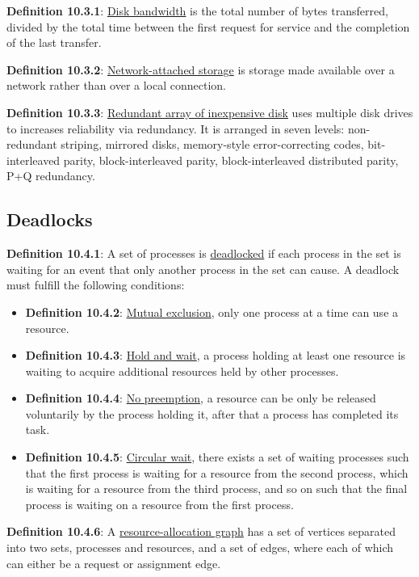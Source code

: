 \documentclass{article}
\newcommand{\separate}[1] {\vspace{#1 pt}\noindent}
\newcommand{\definition}[2]{\textbf{Definition #1}: #2\label{def:#1}}
\begin{document}
\separate{7}\definition{10.3.1}{\underline{Disk bandwidth} is the total number of bytes transferred, divided by the total time between the first request for service and the completion of the last transfer.}

\separate{7}\definition{10.3.2}{\underline{Network-attached storage} is storage made available over a network rather than over a local connection.}

\separate{7}\definition{10.3.3}{\underline{Redundant array of inexpensive disk} uses multiple disk drives to increases reliability via redundancy. It is arranged in seven levels: non-redundant striping, mirrored disks, memory-style error-correcting codes, bit-interleaved parity, block-interleaved parity, block-interleaved distributed parity, P+Q redundancy.}

\subsection{Deadlocks}

\definition{10.4.1}{A set of processes is \underline{deadlocked} if each process in the set is waiting for an event that only another process in the set can cause. A deadlock must fulfill the following conditions:}
\begin{itemize}
    \item \definition{10.4.2}{\underline{Mutual exclusion}, only one process at a time can use a resource.}
    \item \definition{10.4.3}{\underline{Hold and wait}, a process holding at least one resource is waiting to acquire additional resources held by other processes.}
    \item \definition{10.4.4}{\underline{No preemption}, a resource can be only be released voluntarily by the process holding it, after that a process has completed its task.}
    \item \definition{10.4.5}{\underline{Circular wait}, there exists a set of waiting processes such that the first process is waiting for a resource from the second process, which is waiting for a resource from the third process, and so on such that the final process is waiting on a resource from the first process.}
\end{itemize}

\separate{7}\definition{10.4.6}{A \underline{resource-allocation graph} has a set of vertices separated into two sets, processes and resources, and a set of edges, where each of which can either be a request or assignment edge.}
\end{document}
